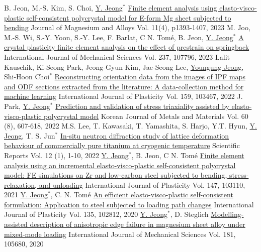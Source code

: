 \begin{cventries}
  {
  }
  \cventry
  {B. Jeon, M.-S. Kim, S. Choi, \underline{Y. Jeong}$^*$}
  {\href{https://doi.org/10.1016/j.jma.2022.10.017}{Finite element analysis using elasto-visco-plastic self-consistent polycrystal model for E-form Mg sheet subjected to bending}}
  {Journal of Magnesium and Alloys}
  {Vol. 11(4), p1393-1407, 2023}
  {
  }
  \cventry
  {M. Joo, M.-S. Wi, S.-Y. Yoon, S.-Y. Lee, F. Barlat, C N. Tom\'{e}, B. Jeon, \underline{Y. Jeong}$^*$}
  {\href{https://doi.org/10.1016/j.ijmecsci.2022.107796}{A crystal plasticity finite element analysis on the effect of prestrain on springback}}
  {International Journal of Mechanical Sciences}
  {Vol. 237, 107796, 2023}
  {
  }
  \cventry
  {Lalit Kauschik, Ki-Seong Park, Jeong-Gyun Kim, Jae-Seong Lee, \underline{Youngung Jeong}, Shi-Hoon Choi$^*$}
  {\href{https://doi.org/10.1016/j.ijplas.2022.103467}{Reconstructing orientation data from the images of IPF maps and ODF sections extracted from the literature: A data-collection method for machine learning}}
  {International Journal of Plasticity}
  {Vol. 159, 103467, 2022}
  {
  }
  \cventry
  {J. Park, \underline{Y. Jeong}$^*$}
  {\href{http://dx.doi.org/10.3365/KJMM.2022.60.8.607}{Prediction and validation of stress triaxiality assisted by elasto-visco-plastic polycrystal model}}
  {Korean Journal of Metals and Materials}
  {Vol. 60 (8), 607-618, 2022}
  {
  }
  \cventry
  {M.S. Lee, T. Kawasaki, T. Yamashita, S. Harjo, Y.T. Hyun, \underline{Y. Jeong}, T. S. Jun$^*$}
  {\href{https://doi.org/10.1038/s41598-022-07640-3}{In-situ neutron diffraction study of lattice deformation behaviour of commercially pure titanium at cryogenic temperature}}
  {Scientific Reports}
  {Vol. 12 (1), 1-10, 2022}
  {
  }
  \cventry
  {\underline{Y. Jeong}$^*$, B. Jeon, C N. Tom\'{e}}
  {\href{https://doi.org/10.1016/j.ijplas.2021.103110}{Finite element analysis using an incremental elasto-visco-plastic self-consistent polycrystal model: FE simulations on Zr and low-carbon steel subjected to bending, stress-relaxation, and unloading}}
  {International Journal of Plasticity}
  {Vol. 147, 103110, 2021}
  {
  }
  \cventry
  {\underline{Y. Jeong}$^*$, C. N. Tom\'{e}}
  {\href{https://doi.org/10.1016/j.ijplas.2020.102812}{An efficient elasto-visco-plastic self-consistent formulation: Application to steel subjected to loading path changes}}
  {International Journal of Plasticity}
  {Vol. 135, 102812, 2020}
  {
  }
  \cventry
  {\underline{Y. Jeong}$^*$, D. Steglich}
  {\href{https://doi.org/10.1016/j.ijmecsci.2020.105680}{Modelling-assisted description of anisotropic edge failure in magnesium sheet alloy under mixed-mode loading}}
  {International Journal of Mechanical Sciences}
  {Vol. 181, 105680, 2020}
  {
  }


\end{cventries}
